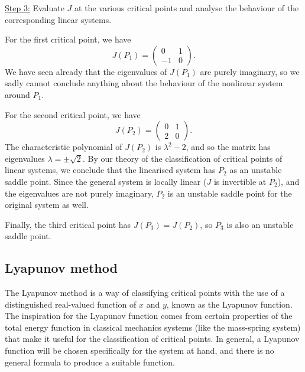 \documentclass[11pt, letterpaper, oneside]{article}     %
\numberwithin{equation}{subsection}
\theoremstyle{definition}
\numberwithin{theorem}{section}
\theoremstyle{remark}
\begin{document}
\begin{enumerate}
  \underline{Step 3:} Evaluate $J$ at the various critical points and analyse the behaviour of the corresponding linear systems.

  For the first critical point, we have
  \begin{equation}
    J(P_1) =
    \begin{pmatrix}
      0 & 1\\
      -1 & 0
    \end{pmatrix}.
  \end{equation}
  We have seen already that the eigenvalues of $J(P_1)$ are purely imaginary, so we sadly cannot conclude anything about the behaviour of the nonlinear system around $P_1$.

  For the second critical point, we have
  \begin{equation}
    J(P_2) =
    \begin{pmatrix}
      0 & 1\\
      2 & 0
    \end{pmatrix}.
  \end{equation}
  The characteristic polynomial of $J(P_2)$ is $\lambda^2 - 2$, and so the matrix has eigenvalues $\lambda = \pm\sqrt{2}$. By our theory of the classification of critical points of linear systems, we conclude that the linearised system has $P_2$ as an unstable saddle point. Since the general system is locally linear ($J$ is invertible at $P_2$), and the eigenvalues are not purely imaginary, $P_2$ is an unstable saddle point for the original system as well.

  Finally, the third critical point has $J(P_3) = J(P_2)$, so $P_3$ is also an unstable saddle point.

  \bigskip

\end{enumerate}

\subsection{Lyapunov method}

The Lyapunov method is a way of classifying critical points with the use of a distinguished real-valued function of $x$ and $y$, known as the Lyapunov function. The inspiration for the Lyapunov function comes from certain properties of the total energy function in classical mechanics systems (like the mass-spring system) that make it useful for the classification of critical points. In general, a Lyapunov function will be chosen specifically for the system at hand, and there is no general formula to produce a suitable function.
\end{document}
